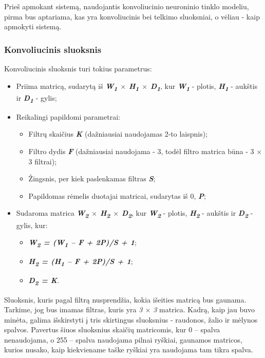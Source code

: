 \documentclass{VUMIFInfKursinis}
\begin{document}
Prieš apmokant sistemą, naudojantis konvoliucinio neuroninio tinklo modeliu, pirma bus aptariama, kas yra konvoliucinis bei telkimo sluoksniai, o vėliau - kaip apmokyti sistemą.

\subsubsection{Konvoliucinis sluoksnis}

Konvoliucinis sluoksnis turi tokius parametrus:
\begin{itemize}
	\item Priima matricą, sudarytą iš \textit{\textbf{W\textsubscript{1} $\times$ H\textsubscript{1} $\times$ D\textsubscript{1}}}, kur \textit{\textbf{W\textsubscript{1}}} - plotis, \textit{\textbf{H\textsubscript{1}}} - aukštis ir \textit{\textbf{D\textsubscript{1}}} - gylis;
	\item Reikalingi papildomi parametrai:
		\begin{itemize}
			\item Filtrų skaičius \textbf{\textit{K}} (dažniausiai naudojamas 2-to laispnis);
			\item Filtro dydis \textbf{\textit{F}} (dažniausiai naudojama - 3, todėl filtro matrica būna - 3 $\times$ 3 filtrai);
			\item Žingsnis, per kiek paslenkamas filtras \textbf{\textit{S}};
			\item Papildomas rėmelis duotajai matricai, sudarytas iš 0, \textbf{\textit{P}};
		\end{itemize}
	\item Sudaroma matrica \textit{\textbf{W\textsubscript{2} $\times$ H\textsubscript{2} $\times$ D\textsubscript{2}}}, kur \textit{\textbf{W\textsubscript{2}}} - plotis, \textit{\textbf{H\textsubscript{2}}} - aukštis ir \textit{\textbf{D\textsubscript{2}}} - gylis, kur:
		\begin{itemize}
			\item \textit{\textbf{W\textsubscript{2} = (W\textsubscript{1} – F + 2P)/S + 1}};
			\item \textit{\textbf{H\textsubscript{2} = (H\textsubscript{1} – F + 2P)/S + 1}};
			\item \textit{\textbf{D\textsubscript{2} = K}}.
		\end{itemize}
\end{itemize}

Sluoksnis, kuris pagal filtrą nusprendžia, kokia išeities matricą bus gaunama. Tarkime, jog bus imamas filtras, kuris yra \textit{3 $\times$ 3} matrica. Kadrą, kaip jau buvo minėta, galima išskirstyti į tris skirtingus sluoksnius - raudonos, žalio ir mėlynos spalvos. Pavertus šiuos sluoksnius skaičių matricomis, kur 0 – spalva nenaudojama, o 255 – spalva naudojama pilnai ryškiai, gaunamos matricos, kurios nusako, kaip kiekviename taške ryškiai yra naudojama tam tikra spalva.
\end{document}
